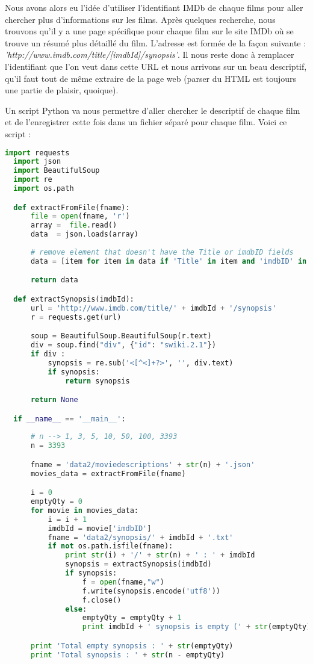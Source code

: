 Nous avons alors eu l'idée d'utiliser l'identifiant IMDb de chaque films pour aller chercher plus d'informations sur les films. Après quelques recherche, nous trouvons qu'il y a une page spécifique pour chaque film sur le site IMDb où se trouve un résumé plus détaillé du film. L'adresse est formée de la façon suivante : \textit{'http://www.imdb.com/title/[imdbId]/synopsis'}. Il nous reste donc à remplacer l'identifiant que l'on veut dans cette URL et nous arrivons sur un beau descriptif, qu'il faut tout de même extraire de la page web (parser du HTML est toujours une partie de plaisir, quoique).

Un script Python va nous permettre d'aller chercher le descriptif de chaque film et de l'enregistrer cette fois dans un fichier séparé pour chaque film. Voici ce script : \\

\begin{lstlisting}[language=python]
  import requests
  import json
  import BeautifulSoup
  import re
  import os.path

  def extractFromFile(fname):
      file = open(fname, 'r')
      array =  file.read()
      data  = json.loads(array)
    
      # remove element that doesn't have the Title or imdbID fields
      data = [item for item in data if 'Title' in item and 'imdbID' in item]

      return data

  def extractSynopsis(imdbId):
      url = 'http://www.imdb.com/title/' + imdbId + '/synopsis'
      r = requests.get(url)

      soup = BeautifulSoup.BeautifulSoup(r.text)
      div = soup.find("div", {"id": "swiki.2.1"})
      if div :
          synopsis = re.sub('<[^<]+?>', '', div.text)
          if synopsis:
              return synopsis

      return None

  if __name__ == '__main__':
    
      # n --> 1, 3, 5, 10, 50, 100, 3393
      n = 3393

      fname = 'data2/moviedescriptions' + str(n) + '.json'
      movies_data = extractFromFile(fname)

      i = 0
      emptyQty = 0
      for movie in movies_data:
          i = i + 1
          imdbId = movie['imdbID']
          fname = 'data2/synopsis/' + imdbId + '.txt'
          if not os.path.isfile(fname):
              print str(i) + '/' + str(n) + ' : ' + imdbId
              synopsis = extractSynopsis(imdbId)
              if synopsis:
                  f = open(fname,"w")
                  f.write(synopsis.encode('utf8'))
                  f.close()
              else:
                  emptyQty = emptyQty + 1
                  print imdbId + ' synopsis is empty (' + str(emptyQty) + ')'

      print 'Total empty synopsis : ' + str(emptyQty)
      print 'Total synopsis : ' + str(n - emptyQty)
\end{lstlisting}


